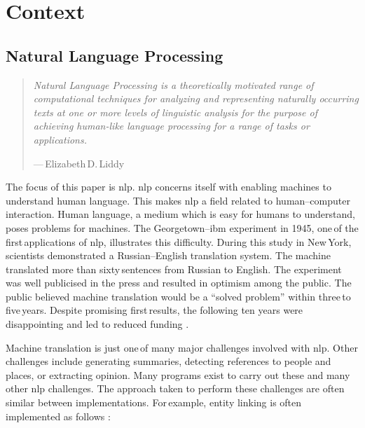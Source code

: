 \chapter{Context}\label{context}

\section{Natural Language Processing}\label{natural-language-processing}

\begin{quote}
  \textit{Natural Language Processing is a theoretically motivated range
    of computational techniques for analyzing and representing
    naturally occurring texts at one or more levels of linguistic
    analysis for the purpose of achieving human-like language processing
    for a range of tasks or applications.
  }

  \medskip
  ---\,Elizabeth\,D.\,Liddy \autocite*{natural-language-processing-liddy-2001}
\end{quote}

\noindent The focus of this paper is \gls{nlp}.
\gls{nlp} concerns itself with enabling machines to understand human
  language.
This makes \gls{nlp} a field related to human--computer interaction.
Human language, a medium which is easy for humans to understand, poses
  problems for machines.
The Georgetown--\gls{ibm} experiment in 1945, one\,of the first\,applications
  of \gls{nlp}, illustrates this difficulty.
During this study in New\,York, scientists demonstrated a
  Russian--English translation system.
The machine translated more than sixty\,sentences from Russian to English.
The experiment was well publicised in the press and resulted in optimism
  among the public.
The public believed machine translation would be a ``solved problem'' within
  three\,to\,five\,years.
Despite promising first\,results, the following ten years were disappointing
  and led to reduced funding \autocite{hutchins-john-georgetown-ibm-system}.

Machine translation is just one\,of many major challenges involved with
  \gls{nlp}.
Other challenges include generating summaries, detecting references to people
  and places, or extracting opinion.
Many programs exist to carry out these and many other \gls{nlp} challenges.
The approach taken to perform these challenges are often similar between
  implementations.
For\,example, entity linking is often implemented as follows
  \autocite[according to][]{stanbol-enhancer-nlp}:

